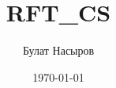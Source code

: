 \documentclass[a4paper, 12pt]{report}
\author{Булат Насыров}
\title{RFT_CS}
\date{\today}
\begin{document}
\maketitle

\tableofcontents{}
\clearpage
\end{document}

